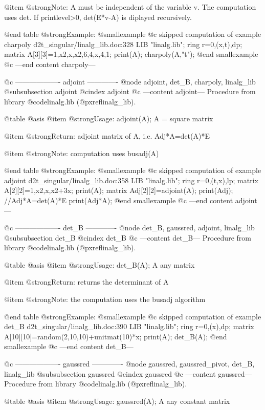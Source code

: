 @item @strong{Note:}
A must be independent of the variable v. The computation uses det.
If printlevel>0, det(E*v-A) is diplayed recursively.

@end table
@strong{Example:}
@smallexample
@c skipped computation of example charpoly d2t_singular/linalg_lib.doc:328 
LIB "linalg.lib";
ring r=0,(x,t),dp;
matrix A[3][3]=1,x2,x,x2,6,4,x,4,1;
print(A);
charpoly(A,"t");
@end smallexample
@c ---end content charpoly---

@c ------------------- adjoint -------------
@node adjoint, det_B, charpoly, linalg_lib
@subsubsection adjoint
@cindex adjoint
@c ---content adjoint---
Procedure from library @code{linalg.lib} (@pxref{linalg_lib}).

@table @asis
@item @strong{Usage:}
adjoint(A); A = square matrix

@item @strong{Return:}
adjoint matrix of A, i.e. Adj*A=det(A)*E

@item @strong{Note:}
computation uses busadj(A)

@end table
@strong{Example:}
@smallexample
@c skipped computation of example adjoint d2t_singular/linalg_lib.doc:358 
LIB "linalg.lib";
ring r=0,(t,x),lp;
matrix A[2][2]=1,x2,x,x2+3x;
print(A);
matrix Adj[2][2]=adjoint(A);
print(Adj);                    //Adj*A=det(A)*E
print(Adj*A);
@end smallexample
@c ---end content adjoint---

@c ------------------- det_B -------------
@node det_B, gaussred, adjoint, linalg_lib
@subsubsection det_B
@cindex det_B
@c ---content det_B---
Procedure from library @code{linalg.lib} (@pxref{linalg_lib}).

@table @asis
@item @strong{Usage:}
det_B(A); A any matrix

@item @strong{Return:}
returns the determinant of A

@item @strong{Note:}
the computation uses the busadj algorithm

@end table
@strong{Example:}
@smallexample
@c skipped computation of example det_B d2t_singular/linalg_lib.doc:390 
LIB "linalg.lib";
ring r=0,(x),dp;
matrix A[10][10]=random(2,10,10)+unitmat(10)*x;
print(A);
det_B(A);
@end smallexample
@c ---end content det_B---

@c ------------------- gaussred -------------
@node gaussred, gaussred_pivot, det_B, linalg_lib
@subsubsection gaussred
@cindex gaussred
@c ---content gaussred---
Procedure from library @code{linalg.lib} (@pxref{linalg_lib}).

@table @asis
@item @strong{Usage:}
gaussred(A); A any constant matrix

